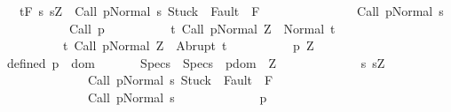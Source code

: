 \begin{isabellebody}
\ \ {\isasymGamma}{\isacharcomma}{\isacharbraceleft}{\isacharbraceright}\ {\isasymturnstile}\isactrlsub t\isactrlbsub {\isacharslash}F\isactrlesub \ {\isacharbraceleft}s{\isachardot}\ s{\isacharequal}Z\ {\isasymand}\ {\isasymGamma}{\isasymturnstile}{\isasymlangle}Call\ p{\isacharcomma}Normal\ s{\isasymrangle}\ {\isasymRightarrow}{\isasymnotin}{\isacharparenleft}{\isacharbraceleft}Stuck{\isacharbraceright}\ {\isasymunion}\ Fault\ {\isacharbackquote}\ {\isacharparenleft}{\isacharminus}F{\isacharparenright}{\isacharparenright}\ {\isasymand}\ \isanewline
\ \ \ \ \ \ \ \ \ \ \ \ \ {\isasymGamma}{\isasymturnstile}{\isacharparenleft}Call\ p{\isacharparenright}{\isasymdown}Normal\ s{\isacharbraceright}\isanewline
\ \ \ \ \ \ \ \ \ \ \ {\isacharparenleft}Call\ p{\isacharparenright}\isanewline
\ \ \ \ \ \ \ \ \ \ {\isacharbraceleft}t{\isachardot}\ {\isasymGamma}{\isasymturnstile}{\isasymlangle}Call\ p{\isacharcomma}Normal\ Z{\isasymrangle}\ {\isasymRightarrow}\ Normal\ t{\isacharbraceright}{\isacharcomma}\isanewline
\ \ \ \ \ \ \ \ \ \ {\isacharbraceleft}t{\isachardot}\ {\isasymGamma}{\isasymturnstile}{\isasymlangle}Call\ p{\isacharcomma}Normal\ Z{\isasymrangle}\ {\isasymRightarrow}\ Abrupt\ t{\isacharbraceright}{\isachardoublequoteclose}\isanewline
%
\isadelimproof
%
\endisadelimproof
%
\isatagproof
{}\isamarkupfalse%
\ {\isacharminus}\isanewline
\ \ \isacommand{{\isacharbraceleft}}\isamarkupfalse%
\isanewline
\ \ \ \ \isamarkupfalse%
\ p\ Z\ {\isasymsigma}\isanewline
\ \ \ \ \isamarkupfalse%
\ defined{\isacharcolon}\ {\isachardoublequoteopen}p\ {\isasymin}\ dom\ {\isasymGamma}{\isachardoublequoteclose}\isanewline
\ \ \ \ \isamarkupfalse%
\ Specs\ \ {\isachardoublequoteopen}Specs\ {\isacharequal}\ {\isacharparenleft}{\isasymUnion}p{\isasymin}dom\ {\isasymGamma}{\isachardot}\ {\isasymUnion}Z{\isachardot}\ \isanewline
\ \ \ \ \ \ \ \ \ \ \ \ {\isacharbraceleft}{\isacharparenleft}{\isacharbraceleft}s{\isachardot}\ s{\isacharequal}Z\ {\isasymand}\ \isanewline
\ \ \ \ \ \ \ \ \ \ \ \ \ \ {\isasymGamma}{\isasymturnstile}{\isasymlangle}Call\ p{\isacharcomma}Normal\ s{\isasymrangle}\ {\isasymRightarrow}{\isasymnotin}{\isacharparenleft}{\isacharbraceleft}Stuck{\isacharbraceright}\ {\isasymunion}\ Fault\ {\isacharbackquote}\ {\isacharparenleft}{\isacharminus}F{\isacharparenright}{\isacharparenright}\ {\isasymand}\ \isanewline
\ \ \ \ \ \ \ \ \ \ \ \ \ \ {\isasymGamma}{\isasymturnstile}Call\ p{\isasymdown}Normal\ s{\isacharbraceright}{\isacharcomma}\isanewline
\ \ \ \ \ \ \ \ \ \ \ \ \ p{\isacharcomma}\isanewline

\end{isabellebody}
